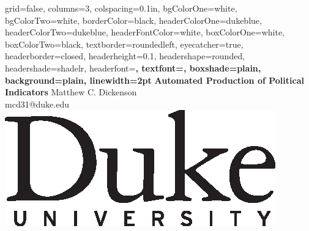 \documentclass[landscape, paperwidth=42in, paperheight=36in,
fontscale=.35, margin=1in]{baposter}
\begin{document}
\begin{poster}{ 
  grid=false,
  columns=3,
  colspacing=0.1in, 
  bgColorOne=white,
  bgColorTwo=white,
  borderColor=black,
  headerColorOne=dukeblue, %
  headerColorTwo=dukeblue, %
  headerFontColor=white,
  boxColorOne=white,
  boxColorTwo=black, %
  textborder=roundedleft,
  eyecatcher=true,
  headerborder=closed,
  headerheight=0.1\textheight,
  headershape=rounded, 
  headershade=shadelr,
  headerfont=\Large\bf\textsf, %
  textfont={\setlength{\parindent}{1.5em}},
  boxshade=plain,
  background=plain,
  linewidth=2pt
  } {%
} {%
\textsf{
	\bf{Automated Production of Political Indicators}}
} { %
	\vspace{1em} \textsf{Matthew C. Dickenson}\\
	{\smaller \textsf{mcd31@duke.edu}}
} {%
  \centering \includegraphics[scale=.8]{dukelogo_vert_black.eps} \hspace{1in}
}


    \newcommand{\colouredcircle}{%
      \tikz{\useasboundingbox (-0.2em,-0.32em) rectangle(0.2em,0.32em); \draw[draw=black,fill=lightblue,line width=0.03em] (0,0) circle(0.18em);}}


\end{poster}
\end{document}
